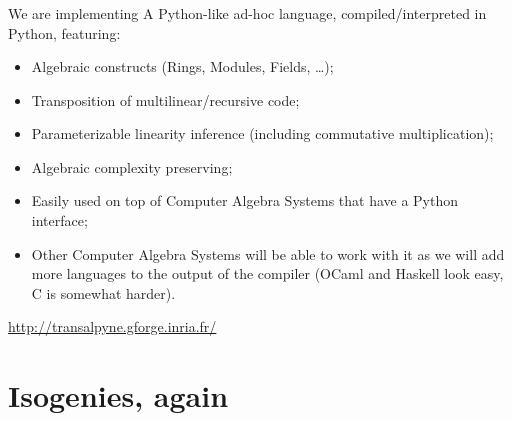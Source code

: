 \documentclass[10pt,usepdftitle=false]{beamer}
\begin{document}
\begin{frame}
  \frametitle{\tALpy{}}
  
  \begin{block}{We are implementing}
    A Python-like ad-hoc language, compiled/interpreted in Python,
    featuring:
    \begin{itemize}
    \item Algebraic constructs (Rings, Modules, Fields, \ldots);
    \item Transposition of multilinear/recursive code;
    \item Parameterizable linearity inference (including commutative
      multiplication);
    \item Algebraic complexity preserving;
    \item Easily used on top of Computer Algebra Systems that have a
      Python interface;
    \item Other Computer Algebra Systems will be able to work with it
      as we will add more languages to the output of the compiler
      (OCaml and Haskell look easy, C is somewhat harder).
    \end{itemize}
  \end{block}

  \begin{center}
    \url{http://transalpyne.gforge.inria.fr/}
  \end{center}
\end{frame}


\section{Isogenies, again}
\end{document}

